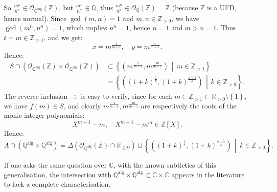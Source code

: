 \begin{solution}
\[    \]
    So \( \frac{m^{n}}{n^{n}} \in \mathcal{O}_{\mathbb{Q}^{\mathrm{alg}}}\left(\mathbb{Z}\right) \), but \( \frac{m^{n}}{n^{n}} \in \mathbb{Q} \), thus \( \frac{m^{n}}{n^{n}} \in \mathcal{O}_{\mathbb{Q}}\left(\mathbb{Z}\right) = \mathbb{Z} \) (because \( \mathbb{Z} \) is a UFD, hence normal). Since \( \gcd\left(m,n\right) = 1 \) and \( m,n\in\mathbb{Z}_{>0} \), we have \( \gcd\left(m^n,n^n\right) = 1 \), which implies \( n^{n} = 1 \), hence \( n = 1 \) and \( m>n=1 \). Thus \( t = m \in \mathbb{Z}_{>1} \), and we get:
    \[
        x = m^{\frac{1}{m-1}}, \quad y = m^{\frac{m}{m-1}}.
    \]
    Hence:
    \begin{align*}
        S \cap \left( \mathcal{O}_{\mathbb{Q}^{\mathrm{alg}}}(\mathbb{Z}) \times \mathcal{O}_{\mathbb{Q}^{\mathrm{alg}}}(\mathbb{Z}) \right)&\subset \left\{ \left( m^{\frac{1}{m-1}}, m^{\frac{m}{m-1}} \right) \,\middle|\, m \in \mathbb{Z}_{>1} \right\}\\&= \left\{ \left( (1+k)^{\frac{1}{k}}, (1+k)^{\frac{k+1}{k}} \right) \,\middle|\, k \in \mathbb{Z}_{>0} \right\}.
    \end{align*}
    The reverse inclusion \( \supset \) is easy to verify, since for each \( m \in \mathbb{Z}_{>1} \subset \mathbb{R}_{>0} \setminus \left\{ 1 \right\} \), we have \( f\left(m\right) \in S \), and clearly \( m^{\frac{1}{m-1}}, m^{\frac{m}{m-1}} \) are respectively the roots of the monic integer polynomials:
    \[
        X^{m-1} - m, \quad X^{m-1} - m^{m} \in \mathbb{Z}\left[X\right].
    \]
    Hence:
    \[
        A \cap \left( \mathbb{Q}^{\mathrm{alg}} \times \mathbb{Q}^{\mathrm{alg}} \right) = \Delta\left( \mathcal{O}_{\mathbb{Q}^{\mathrm{alg}}}\left(\mathbb{Z}\right) \cap \mathbb{R}_{\geq 0} \right) \sqcup \left\{ \left( \left(1+k\right)^{\frac{1}{k}}, \left(1+k\right)^{\frac{k+1}{k}} \right) \,\middle|\, k \in \mathbb{Z}_{>0} \right\}.
    \]
    \begin{remark}
        If one asks the same question over \( \mathbb{C} \), with the known subtleties of this generalisation, the intersection with \( \mathbb{Q}^{\mathrm{alg}} \times \mathbb{Q}^{\mathrm{alg}} \subset \mathbb{C} \times \mathbb{C} \) appears in the literature to lack a complete characterisation.
    \end{remark}
\end{solution}
